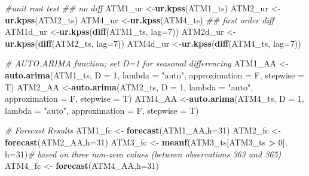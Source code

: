 \documentclass[openany]{book}
\newenvironment{Shaded}{\begin{snugshade}}{\end{snugshade}}
\newcommand{\CommentTok}[1]{\textcolor[rgb]{0.56,0.35,0.01}{\textit{#1}}}
\newcommand{\DataTypeTok}[1]{\textcolor[rgb]{0.13,0.29,0.53}{#1}}
\newcommand{\DecValTok}[1]{\textcolor[rgb]{0.00,0.00,0.81}{#1}}
\newcommand{\KeywordTok}[1]{\textcolor[rgb]{0.13,0.29,0.53}{\textbf{#1}}}
\newcommand{\NormalTok}[1]{#1}
\newcommand{\OperatorTok}[1]{\textcolor[rgb]{0.81,0.36,0.00}{\textbf{#1}}}
\newcommand{\StringTok}[1]{\textcolor[rgb]{0.31,0.60,0.02}{#1}}
\begin{document}
\begin{Shaded}
\begin{Highlighting}[]
{{{{{\CommentTok{#unit root test}
\CommentTok{## no diff}
\NormalTok{ATM1_ur <-}\KeywordTok{ur.kpss}\NormalTok{(ATM1_ts)}
\NormalTok{ATM2_ur <-}\KeywordTok{ur.kpss}\NormalTok{(ATM2_ts)}
\NormalTok{ATM4_ur <-}\KeywordTok{ur.kpss}\NormalTok{(ATM4_ts)}
\CommentTok{## first order diff}
\NormalTok{ATM1d_ur <-}\KeywordTok{ur.kpss}\NormalTok{(}\KeywordTok{diff}\NormalTok{(ATM1_ts, }\DataTypeTok{lag=}\DecValTok{7}\NormalTok{))}
\NormalTok{ATM2d_ur <-}\KeywordTok{ur.kpss}\NormalTok{(}\KeywordTok{diff}\NormalTok{(ATM2_ts, }\DataTypeTok{lag=}\DecValTok{7}\NormalTok{))}
\NormalTok{ATM4d_ur <-}\KeywordTok{ur.kpss}\NormalTok{(}\KeywordTok{diff}\NormalTok{(ATM4_ts, }\DataTypeTok{lag=}\DecValTok{7}\NormalTok{))}

\CommentTok{# AUTO.ARIMA function; set D=1 for seasonal differencing}
\NormalTok{ATM1_AA <-}\KeywordTok{auto.arima}\NormalTok{(ATM1_ts, }\DataTypeTok{D =} \DecValTok{1}\NormalTok{, }\DataTypeTok{lambda =} \StringTok{"auto"}\NormalTok{, }\DataTypeTok{approximation =}\NormalTok{ F, }\DataTypeTok{stepwise =}\NormalTok{ T)}
\NormalTok{ATM2_AA <-}\KeywordTok{auto.arima}\NormalTok{(ATM2_ts, }\DataTypeTok{D =} \DecValTok{1}\NormalTok{, }\DataTypeTok{lambda =} \StringTok{"auto"}\NormalTok{, }\DataTypeTok{approximation =}\NormalTok{ F, }\DataTypeTok{stepwise =}\NormalTok{ T)}
\NormalTok{ATM4_AA <-}\KeywordTok{auto.arima}\NormalTok{(ATM4_ts, }\DataTypeTok{D =} \DecValTok{1}\NormalTok{, }\DataTypeTok{lambda =} \StringTok{"auto"}\NormalTok{, }\DataTypeTok{approximation =}\NormalTok{ F, }\DataTypeTok{stepwise =}\NormalTok{ T)}

\CommentTok{# Forecast Results}
\NormalTok{ATM1_fc <-}\StringTok{ }\KeywordTok{forecast}\NormalTok{(ATM1_AA,}\DataTypeTok{h=}\DecValTok{31}\NormalTok{)}
\NormalTok{ATM2_fc <-}\StringTok{ }\KeywordTok{forecast}\NormalTok{(ATM2_AA,}\DataTypeTok{h=}\DecValTok{31}\NormalTok{)}
\NormalTok{ATM3_fc <-}\StringTok{ }\KeywordTok{meanf}\NormalTok{(ATM3_ts[ATM3_ts }\OperatorTok{>}\StringTok{ }\DecValTok{0}\NormalTok{], }\DataTypeTok{h=}\DecValTok{31}\NormalTok{)}\CommentTok{# based on three non-zero values (between observations 363 and 365)}
\NormalTok{ATM4_fc <-}\StringTok{ }\KeywordTok{forecast}\NormalTok{(ATM4_AA,}\DataTypeTok{h=}\DecValTok{31}\NormalTok{)}

}}}}}
\end{Highlighting}
\end{Shaded}
\end{document}

